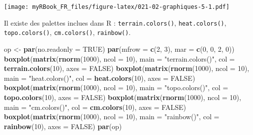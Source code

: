 \documentclass[
]{book}
\newenvironment{Shaded}{\begin{snugshade}}{\end{snugshade}}
\newcommand{\DataTypeTok}[1]{\textcolor[rgb]{0.13,0.29,0.53}{#1}}
\newcommand{\DecValTok}[1]{\textcolor[rgb]{0.00,0.00,0.81}{#1}}
\newcommand{\KeywordTok}[1]{\textcolor[rgb]{0.13,0.29,0.53}{\textbf{#1}}}
\newcommand{\NormalTok}[1]{#1}
\newcommand{\OtherTok}[1]{\textcolor[rgb]{0.56,0.35,0.01}{#1}}
\newcommand{\StringTok}[1]{\textcolor[rgb]{0.31,0.60,0.02}{#1}}
\begin{document}
\texttt{[image: myRBook\_FR\_files/figure-latex/021-02-graphiques-5-1.pdf]}

Il existe des palettes inclues dans R : \texttt{terrain.colors()}, \texttt{heat.colors()}, \texttt{topo.colors()},
\texttt{cm.colors()}, \texttt{rainbow()}.

\begin{Shaded}
\begin{Highlighting}[]
\NormalTok{op <-}\StringTok{ }\KeywordTok{par}\NormalTok{(}\DataTypeTok{no.readonly =} \OtherTok{TRUE}\NormalTok{)}
\KeywordTok{par}\NormalTok{(}\DataTypeTok{mfrow =} \KeywordTok{c}\NormalTok{(}\DecValTok{2}\NormalTok{, }\DecValTok{3}\NormalTok{), }\DataTypeTok{mar =} \KeywordTok{c}\NormalTok{(}\DecValTok{0}\NormalTok{, }\DecValTok{0}\NormalTok{, }\DecValTok{2}\NormalTok{, }\DecValTok{0}\NormalTok{))}
\KeywordTok{boxplot}\NormalTok{(}\KeywordTok{matrix}\NormalTok{(}\KeywordTok{rnorm}\NormalTok{(}\DecValTok{1000}\NormalTok{), }\DataTypeTok{ncol =} \DecValTok{10}\NormalTok{), }\DataTypeTok{main =} \StringTok{"terrain.colors()"}\NormalTok{, }
  \DataTypeTok{col =} \KeywordTok{terrain.colors}\NormalTok{(}\DecValTok{10}\NormalTok{), }\DataTypeTok{axes =} \OtherTok{FALSE}\NormalTok{)}
\KeywordTok{boxplot}\NormalTok{(}\KeywordTok{matrix}\NormalTok{(}\KeywordTok{rnorm}\NormalTok{(}\DecValTok{1000}\NormalTok{), }\DataTypeTok{ncol =} \DecValTok{10}\NormalTok{), }\DataTypeTok{main =} \StringTok{"heat.colors()"}\NormalTok{, }
  \DataTypeTok{col =} \KeywordTok{heat.colors}\NormalTok{(}\DecValTok{10}\NormalTok{), }\DataTypeTok{axes =} \OtherTok{FALSE}\NormalTok{)}
\KeywordTok{boxplot}\NormalTok{(}\KeywordTok{matrix}\NormalTok{(}\KeywordTok{rnorm}\NormalTok{(}\DecValTok{1000}\NormalTok{), }\DataTypeTok{ncol =} \DecValTok{10}\NormalTok{), }\DataTypeTok{main =} \StringTok{"topo.colors()"}\NormalTok{, }
  \DataTypeTok{col =} \KeywordTok{topo.colors}\NormalTok{(}\DecValTok{10}\NormalTok{), }\DataTypeTok{axes =} \OtherTok{FALSE}\NormalTok{)}
\KeywordTok{boxplot}\NormalTok{(}\KeywordTok{matrix}\NormalTok{(}\KeywordTok{rnorm}\NormalTok{(}\DecValTok{1000}\NormalTok{), }\DataTypeTok{ncol =} \DecValTok{10}\NormalTok{), }\DataTypeTok{main =} \StringTok{"cm.colors()"}\NormalTok{, }
  \DataTypeTok{col =} \KeywordTok{cm.colors}\NormalTok{(}\DecValTok{10}\NormalTok{), }\DataTypeTok{axes =} \OtherTok{FALSE}\NormalTok{)}
\KeywordTok{boxplot}\NormalTok{(}\KeywordTok{matrix}\NormalTok{(}\KeywordTok{rnorm}\NormalTok{(}\DecValTok{1000}\NormalTok{), }\DataTypeTok{ncol =} \DecValTok{10}\NormalTok{), }\DataTypeTok{main =} \StringTok{"rainbow()"}\NormalTok{, }
  \DataTypeTok{col =} \KeywordTok{rainbow}\NormalTok{(}\DecValTok{10}\NormalTok{), }\DataTypeTok{axes =} \OtherTok{FALSE}\NormalTok{)}
\KeywordTok{par}\NormalTok{(op)}
\end{Highlighting}
\end{Shaded}
\end{document}
